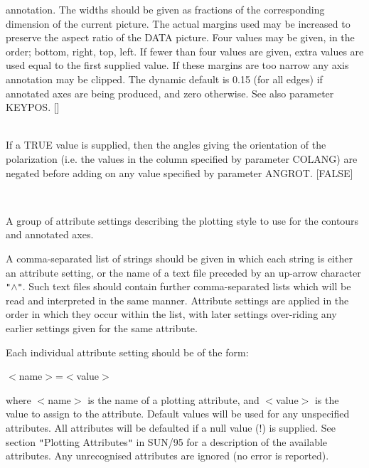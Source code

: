 \documentclass[twoside,11pt]{article}
\renewcommand{\_}{\texttt{\symbol{95}}}
\newcommand{\sstsubsection}[1]{ \item[{#1}] \mbox{} \\}
\newcommand{\sstsubsection}[1]{\item[{#1}]}
\begin{document}
{{{         annotation. The widths should be given as fractions of the
         corresponding dimension of the current picture.
         The actual margins used may be increased to preserve the aspect
         ratio of the DATA picture. Four values may be given, in the order;
         bottom, right, top, left. If fewer than four values are given,
         extra values are used equal to the first supplied value. If these
         margins are too narrow any axis annotation may be clipped. The
         dynamic default is 0.15 (for all edges) if annotated axes are being
         produced, and zero otherwise. See also parameter KEYPOS. []
      }
      \sstsubsection{
         NEGATE = \_LOGICAL (Read)
      }{
         If a TRUE value is supplied, then the angles giving the
         orientation of the polarization (i.e. the values in the column
         specified by parameter COLANG) are negated before adding on any
         value specified by parameter ANGROT. [FALSE]
      }
      \sstsubsection{
         STYLE = GROUP (Read)
      }{
         A group of attribute settings describing the plotting style to use
         for the contours and annotated axes.

         A comma-separated list of strings should be given in which each
         string is either an attribute setting, or the name of a text file
         preceded by an up-arrow character {\tt "}$\wedge${\tt "}. Such text files should
         contain further comma-separated lists which will be read and
         interpreted in the same manner. Attribute settings are applied in
         the order in which they occur within the list, with later settings
         over-riding any earlier settings given for the same attribute.

         Each individual attribute setting should be of the form:

            $<$name$>$=$<$value$>$

         where $<$name$>$ is the name of a plotting attribute, and $<$value$>$ is
         the value to assign to the attribute. Default values will be
         used for any unspecified attributes. All attributes will be
         defaulted if a null value (!) is supplied. See section {\tt "}Plotting
         Attributes{\tt "} in SUN/95 for a description of the available
         attributes. Any unrecognised attributes are ignored (no error is
         reported).

}}}
\end{document}
